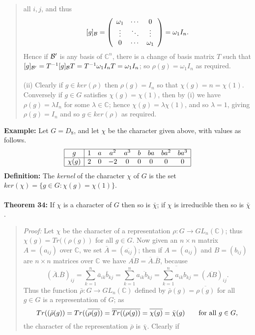 {\begin{quote}
all $i,j$, and thus
$$[g]_{\cal B}=\left(\begin{array}{ccc}\omega_1&\cdots&0\\
\vdots&\ddots&\vdots\\0&\cdots&\omega_1\end{array}\right)= \omega_1I_n.$$
Hence if ${\cal B}'$ is any basis of ${\mathbb C}^n$, there is a change of basis matrix
$T$ such that $[g]_{{\cal B}'}=T^{-1}[g]_{\cal B} T=T^{-1}\omega_1 I_n T=\omega_1 I_n$; so
$\rho(g)=\omega_1I_n$ as required.
\\
\\
(ii) Clearly if $g\in ker(\rho)$ then $\rho(g)=I_n$ so that
$\chi(g)=n=\chi(1)$. Conversely if $g\in G$ satisfies $\chi(g)=\chi(1)$, then
by (i) we have $\rho(g)=\lambda I_n$ for some $\lambda\in{\mathbb C}$; hence
$\chi(g)=\lambda\chi(1)$, and so $\lambda=1$, giving $\rho(g)=I_n$ and so
$g \in ker(\rho)$ as required.
\end{quote}
{\bf Example:} Let $G=D_8$, and let $\chi$ be the character given
above, with values as follows.
$$
\begin{array}{|c|cccccccc|}
\hline
g&1&a&a^2&a^3&b&ba&ba^2&ba^3\\
\hline
\chi(g)&2&0&-2&0&0&0&0&0\\
\hline
\end{array}
$$
{\bf Definition:} The \emph{kernel} of the character $\chi$ of
$G$ is the set $ker(\chi)=\{g\in G:\chi(g)=\chi(1)\}$.
\\
\\
{\bf Theorem 34:} If $\chi$ is a character of $G$ then so is
$\bar\chi$; if $\chi$ is irreducible then so is $\bar\chi$.
\begin{quote}
\emph{Proof:}
Let $\chi$ be the character of a representation
$\rho:G\rightarrow GL_n({\mathbb C})$; thus $\chi(g)=Tr((\rho(g))$ for all $g\in G$.
Now given an $n\times n$ matrix $A=(a_{ij})$ over ${\mathbb C}$, we set
$\bar A=(\overline{a_{ij}})$; then if $A=(a_{ij})$ and $B=(b_{ij})$ are
$n\times n$ matrices over ${\mathbb C}$ we have
$\overline{AB}=\overline{A}.\overline{B}$, because
$$(\overline{A}.\overline{B})_{ij}
=\sum_{k=1}^n\bar a_{ik}\bar b_{kj}=\sum_{k=1}^n\overline{a_{ik}b_{kj}}
=\overline{\sum_{k=1}^na_{ik}b_{kj}}=(\overline{AB})_{ij}.$$
Thus the function $\bar\rho:G\rightarrow GL_n({\mathbb C})$ defined by
$\bar\rho(g)=\overline{\rho(g)}$ for all $g\in G$ is a representation of $G$;
as $$Tr((\bar\rho(g))=Tr((\overline{\rho(g)})=\overline{Tr((\rho(g))}
=\overline{\chi(g)}=\bar\chi(g)\qquad\hbox{for all }g\in G,$$
the character of the representation $\bar\rho$ is $\bar\chi$. Clearly if

\end{quote}}

